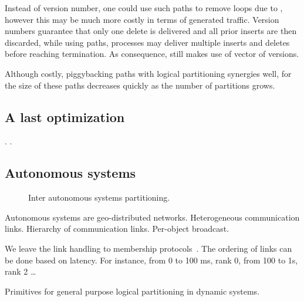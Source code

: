 \noindent Instead of version number, one could use such paths to remove loops
due to , however this may be much more costly in
terms of generated traffic. Version numbers guarantee that only one
delete is delivered and all prior inserts are then discarded, while
using paths, processes may deliver multiple inserts and deletes before
reaching termination.  As
consequence, \NAME still makes use of vector of versions.

\noindent Although costly, piggybacking paths with logical partitioning synergies
well, for the size of these paths decreases quickly as the number of
partitions grows.



\subsection{A last optimization}
 . .



\subsection{Autonomous systems}

\begin{figure}
  \centering
  \caption{\label{fig:AS}Inter autonomous systems partitioning. }
\end{figure}

Autonomous systems are geo-distributed networks. Heterogeneous
communication links. Hierarchy of communication links. Per-object
broadcast.

We leave the link handling to membership protocols~\REF. The ordering
of links can be done based on latency. For instance, from 0 to 100 ms,
rank 0, from 100 to 1s, rank 2 \ldots

\begin{algorithm}
  
  \caption{\label{algo:aaaa}Primitives for general purpose logical
    partitioning in dynamic systems.}
\end{algorithm}

